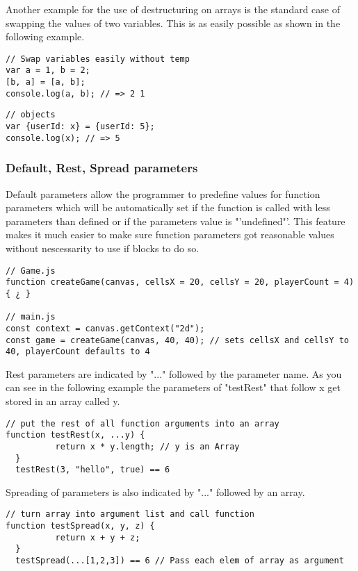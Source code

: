\documentclass{bioinfo}
\begin{document}
Another example for the use of destructuring on arrays is the standard case of swapping the values of two variables.
This is as easily possible as shown in the following example.
\begin{lstlisting}[caption= My Javascript Example]
// Swap variables easily without temp
var a = 1, b = 2;
[b, a] = [a, b];
console.log(a, b); // => 2 1
\end{lstlisting}


\begin{lstlisting}[caption= My Javascript Example]
// objects
var {userId: x} = {userId: 5};
console.log(x); // => 5
\end{lstlisting}

\subsubsection{Default, Rest, Spread parameters}
Default parameters allow the programmer to predefine values for function parameters which will be automatically
set if the function is called with less parameters than defined or if the parameters value is "'undefined"'.
This feature makes it much easier to make sure function parameters got reasonable values without nescessarity to
use if blocks to do so.

\begin{lstlisting}[caption= My Javascript Example]
// Game.js
function createGame(canvas, cellsX = 20, cellsY = 20, playerCount = 4) { ¿ }

// main.js
const context = canvas.getContext("2d");
const game = createGame(canvas, 40, 40); // sets cellsX and cellsY to 40, playerCount defaults to 4
\end{lstlisting}

Rest parameters are indicated by  "..." followed by the parameter name. As you can see in the following 
example the parameters of "testRest" that follow x get stored in an array called y.

\begin{lstlisting}[caption= My Javascript Example]
// put the rest of all function arguments into an array
function testRest(x, ...y) {
          return x * y.length; // y is an Array
  }
  testRest(3, "hello", true) == 6
\end{lstlisting}

Spreading of parameters is also indicated by "..." followed by an array. 
\begin{lstlisting}[caption= My Javascript Example]
// turn array into argument list and call function
function testSpread(x, y, z) {
          return x + y + z;
  }
  testSpread(...[1,2,3]) == 6 // Pass each elem of array as argument
\end{lstlisting}
\end{document}
